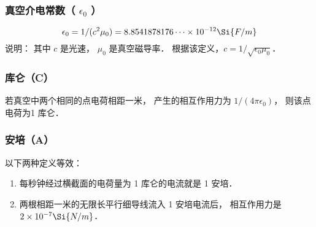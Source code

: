 \subsubsection{真空介电常数（ $\epsilon_0$ ）}
\begin{equation}
\epsilon_0 = 1/(c^2 \mu_0) = 8.8541878176\dots \times 10^{-12} \Si{F/m}
\end{equation}
说明： 其中 $c$ 是光速， $\mu_0$ 是真空磁导率． 根据该定义，$c = 1/\sqrt{\epsilon_0 \mu_0} $．  

\subsubsection{库仑（C）}
若真空中两个相同的点电荷相距一米， 产生的相互作用力为 $1/(4\pi\epsilon_0)$，   则该点电荷为1 库仑．

\subsubsection{安培（A）}
以下两种定义等效：
\begin{enumerate}
\item 每秒钟经过横截面的电荷量为 1 库仑的电流就是 1 安培．
\item 两根相距一米的无限长平行细导线流入 1 安培电流后， 相互作用力是 $2 \times 10^{-7}\Si{N/m}$． 
\end{enumerate}



